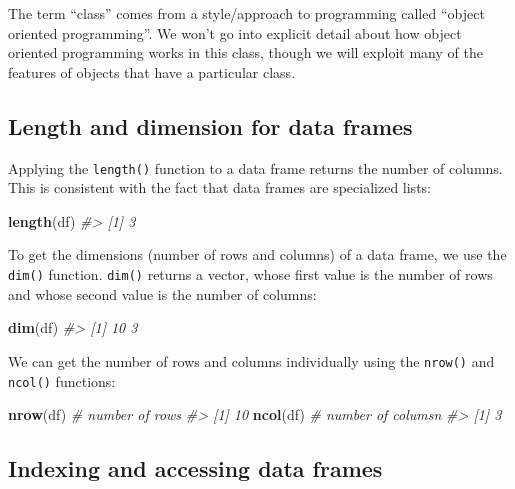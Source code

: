 \documentclass[]{book}
\newenvironment{Shaded}{\begin{snugshade}}{\end{snugshade}}
\newcommand{\CommentTok}[1]{\textcolor[rgb]{0.56,0.35,0.01}{\textit{#1}}}
\newcommand{\KeywordTok}[1]{\textcolor[rgb]{0.13,0.29,0.53}{\textbf{#1}}}
\newcommand{\NormalTok}[1]{#1}
\theoremstyle{definition}
\theoremstyle{definition}
\theoremstyle{definition}
\theoremstyle{remark}
\begin{document}
The term ``class'' comes from a style/approach to programming called
``object oriented programming''. We won't go into explicit detail about
how object oriented programming works in this class, though we will
exploit many of the features of objects that have a particular class.

\hypertarget{length-and-dimension-for-data-frames}{%
\subsection{Length and dimension for data
frames}\label{length-and-dimension-for-data-frames}}

Applying the \texttt{length()} function to a data frame returns the
number of columns. This is consistent with the fact that data frames are
specialized lists:

\begin{Shaded}
\begin{Highlighting}[]
\KeywordTok{length}\NormalTok{(df)}
\CommentTok{#> [1] 3}
\end{Highlighting}
\end{Shaded}

To get the dimensions (number of rows and columns) of a data frame, we
use the \texttt{dim()} function. \texttt{dim()} returns a vector, whose
first value is the number of rows and whose second value is the number
of columns:

\begin{Shaded}
\begin{Highlighting}[]
\KeywordTok{dim}\NormalTok{(df)}
\CommentTok{#> [1] 10  3}
\end{Highlighting}
\end{Shaded}

We can get the number of rows and columns individually using the
\texttt{nrow()} and \texttt{ncol()} functions:

\begin{Shaded}
\begin{Highlighting}[]
\KeywordTok{nrow}\NormalTok{(df)  }\CommentTok{# number of rows}
\CommentTok{#> [1] 10}
\KeywordTok{ncol}\NormalTok{(df)  }\CommentTok{# number of columsn}
\CommentTok{#> [1] 3}
\end{Highlighting}
\end{Shaded}

\hypertarget{indexing-and-accessing-data-frames}{%
\subsection{Indexing and accessing data
frames}\label{indexing-and-accessing-data-frames}}
\end{document}
